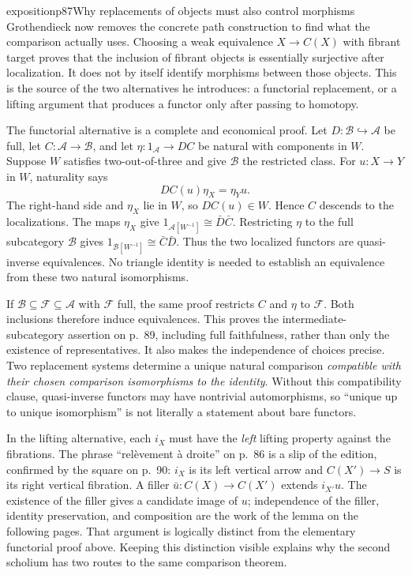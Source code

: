 \begin{dcomment}{exposition}{p87}{Why replacements of objects must also control morphisms}
Grothendieck now removes the concrete path construction to find what the comparison actually uses. Choosing a weak equivalence $X\to C(X)$ with fibrant target proves that the inclusion of fibrant objects is essentially surjective after localization. It does not by itself identify morphisms between those objects. This is the source of the two alternatives he introduces: a functorial replacement, or a lifting argument that produces a functor only after passing to homotopy.

The functorial alternative is a complete and economical proof. Let $D:\mathcal B\hookrightarrow\mathcal A$ be full, let $C:\mathcal A\to\mathcal B$, and let $\eta:1_{\mathcal A}\to DC$ be natural with components in $W$. Suppose $W$ satisfies two-out-of-three and give $\mathcal B$ the restricted class. For $u:X\to Y$ in $W$, naturality says
\[
 DC(u)\eta_X=\eta_Yu.
\]
The right-hand side and $\eta_X$ lie in $W$, so $DC(u)\in W$. Hence $C$ descends to the localizations. The maps $\eta_X$ give $1_{\mathcal A[W^{-1}]}\cong\bar D\bar C$. Restricting $\eta$ to the full subcategory $\mathcal B$ gives $1_{\mathcal B[W^{-1}]}\cong\bar C\bar D$. Thus the two localized functors are quasi-inverse equivalences. No triangle identity is needed to establish an equivalence from these two natural isomorphisms.

If $\mathcal B\subseteq\mathcal F\subseteq\mathcal A$ with $\mathcal F$ full, the same proof restricts $C$ and $\eta$ to $\mathcal F$. Both inclusions therefore induce equivalences. This proves the intermediate-subcategory assertion on p.~89, including full faithfulness, rather than only the existence of representatives. It also makes the independence of choices precise. Two replacement systems determine a unique natural comparison \emph{compatible with their chosen comparison isomorphisms to the identity}. Without this compatibility clause, quasi-inverse functors may have nontrivial automorphisms, so ``unique up to unique isomorphism'' is not literally a statement about bare functors.

In the lifting alternative, each $i_X$ must have the \emph{left} lifting property against the fibrations. The phrase ``relèvement à droite'' on p.~86 is a slip of the edition, confirmed by the square on p.~90: $i_X$ is its left vertical arrow and $C(X')\to S$ is its right vertical fibration. A filler $\bar u:C(X)\to C(X')$ extends $i_{X'}u$. The existence of the filler gives a candidate image of $u$; independence of the filler, identity preservation, and composition are the work of the lemma on the following pages. That argument is logically distinct from the elementary functorial proof above. Keeping this distinction visible explains why the second scholium has two routes to the same comparison theorem.
\end{dcomment}

